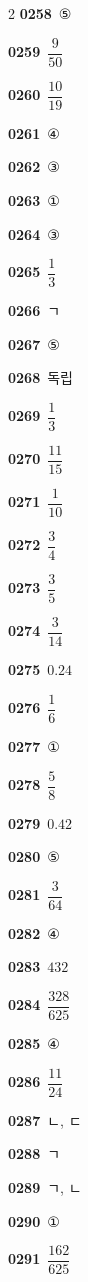 \documentclass[10pt,a4paper]{article}
\begin{document}
\begin{multicols}{2}
\noindent\textbf{0258}\ ⑤\par
\noindent\textbf{0259}\ $\dfrac{9}{50}$\par
\noindent\textbf{0260}\ $\dfrac{10}{19}$\par
\noindent\textbf{0261}\ ④\par
\noindent\textbf{0262}\ ③\par
\noindent\textbf{0263}\ ①\par
\noindent\textbf{0264}\ ③\par
\noindent\textbf{0265}\ $\dfrac{1}{3}$\par
\noindent\textbf{0266}\ ㄱ\par
\noindent\textbf{0267}\ ⑤\par
\noindent\textbf{0268}\ 독립\par
\noindent\textbf{0269}\ $\dfrac{1}{3}$\par
\noindent\textbf{0270}\ $\dfrac{11}{15}$\par
\noindent\textbf{0271}\ $\dfrac{1}{10}$\par
\noindent\textbf{0272}\ $\dfrac{3}{4}$\par
\noindent\textbf{0273}\ $\dfrac{3}{5}$\par
\noindent\textbf{0274}\ $\dfrac{3}{14}$\par
\noindent\textbf{0275}\ $0.24$\par
\noindent\textbf{0276}\ $\dfrac{1}{6}$\par
\noindent\textbf{0277}\ ①\par
\noindent\textbf{0278}\ $\dfrac{5}{8}$\par
\noindent\textbf{0279}\ $0.42$\par
\noindent\textbf{0280}\ ⑤\par
\noindent\textbf{0281}\ $\dfrac{3}{64}$\par
\noindent\textbf{0282}\ ④\par
\noindent\textbf{0283}\ $432$\par
\noindent\textbf{0284}\ $\dfrac{328}{625}$\par
\noindent\textbf{0285}\ ④\par
\noindent\textbf{0286}\ $\dfrac{11}{24}$\par
\noindent\textbf{0287}\ ㄴ, ㄷ\par
\noindent\textbf{0288}\ ㄱ\par
\noindent\textbf{0289}\ ㄱ, ㄴ\par
\noindent\textbf{0290}\ ①\par
\noindent\textbf{0291}\ $\dfrac{162}{625}$\par

\end{multicols}
\end{document}
